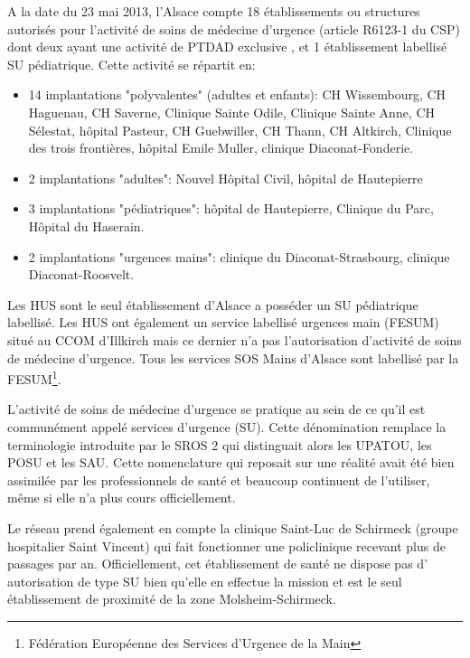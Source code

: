 \documentclass[12pt,english,french,twoside]{book}\usepackage[]{graphicx}\usepackage[]{color}
\begin{document}
A la date du 23 mai 2013, l'Alsace compte 18 établissements ou structures autorisés pour l'activité de soins de médecine d'urgence (article R6123-1 du CSP) dont deux ayant une activité de PTDAD exclusive \cite{15}, et 1 établissement labellisé SU pédiatrique. Cette activité se répartit en:
\begin{itemize}
  \item 14 implantations "polyvalentes" (adultes et enfants): CH Wissembourg, CH Haguenau, CH Saverne, Clinique Sainte Odile, Clinique Sainte Anne, CH Sélestat, hôpital Pasteur, CH Guebwiller, CH Thann, CH Altkirch, Clinique des trois frontières, hôpital Emile Muller, clinique Diaconat-Fonderie.
  \item 2 implantations "adultes": Nouvel Hôpital Civil, hôpital de Hautepierre
  \item 3 implantations "pédiatriques": hôpital de Hautepierre, Clinique du Parc, Hôpital du Haserain.
  \item 2 implantations "urgences mains": clinique du Diaconat-Strasbourg, clinique Diaconat-Roosvelt.
\end{itemize}

Les HUS sont le seul établissement d'Alsace a posséder un SU pédiatrique labellisé. Les HUS ont également un service labellisé urgences main (FESUM) situé au CCOM d'Illkirch mais ce dernier n'a pas l'autorisation d'activité de soins de médecine d'urgence. Tous les services SOS Mains d'Alsace sont labellisé par la FESUM\footnote{Fédération Européenne des Services d'Urgence de la Main}.


L'activité de soins de médecine d'urgence se pratique au sein de ce qu'il est communément appelé services d'urgence (SU). Cette dénomination remplace la terminologie introduite par le SROS 2 qui distinguait alors les UPATOU, les POSU et les SAU. Cette nomenclature qui reposait sur une réalité avait été bien assimilée par les professionnels de santé et beaucoup continuent de l'utiliser, même si elle n'a plus cours officiellement. 

Le réseau prend également en compte la clinique Saint-Luc de Schirmeck (groupe hospitalier Saint Vincent) qui fait fonctionner une policlinique recevant plus de  passages par an. Officiellement, cet établissement de santé ne dispose pas d' autorisation de type SU bien qu'elle en effectue la mission et est le seul établissement de proximité de la zone Molsheim-Schirmeck.
\end{document}
